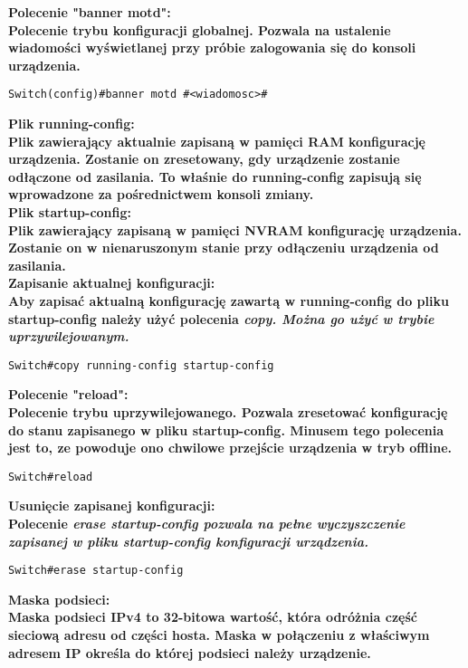 \documentclass[a4paper,12pt]{article}
\newcommand{\h}[1]{\noindent \bf #1 \rm \\ \noindent}
\begin{document}
\h{Polecenie "banner motd":}
Polecenie trybu konfiguracji globalnej. Pozwala na ustalenie wiadomości wyświetlanej przy próbie zalogowania się do konsoli urządzenia.
\begin{lstlisting}
Switch(config)#banner motd #<wiadomosc>#
\end{lstlisting}
\vspace{5mm}

\h{Plik running-config:}
Plik zawierający aktualnie zapisaną w pamięci RAM konfigurację urządzenia. Zostanie on zresetowany, gdy urządzenie zostanie odłączone od zasilania. To właśnie do running-config zapisują się wprowadzone za pośrednictwem konsoli zmiany.\\

\h{Plik startup-config:}
Plik zawierający zapisaną w pamięci NVRAM konfigurację urządzenia. Zostanie on w nienaruszonym stanie przy odłączeniu urządzenia od zasilania.\\

\newpage
\h{Zapisanie aktualnej konfiguracji:}
Aby zapisać aktualną konfigurację zawartą w running-config do pliku startup-config należy użyć polecenia \it copy\rm. Można go użyć w trybie uprzywilejowanym.
\begin{lstlisting}
Switch#copy running-config startup-config
\end{lstlisting}
\vspace{5mm}

\h{Polecenie "reload":}
Polecenie trybu uprzywilejowanego. Pozwala zresetować konfigurację do stanu zapisanego w pliku startup-config. Minusem tego polecenia jest to, ze powoduje ono chwilowe przejście urządzenia w tryb offline.
\begin{lstlisting}
Switch#reload
\end{lstlisting}
\vspace{5mm}

\h{Usunięcie zapisanej konfiguracji:}
Polecenie \it erase startup-config \rm pozwala na pełne wyczyszczenie zapisanej w pliku startup-config konfiguracji urządzenia.
\begin{lstlisting}
Switch#erase startup-config
\end{lstlisting}
\vspace{5mm}

\h{Maska podsieci:}
Maska podsieci IPv4 to 32-bitowa wartość, która odróżnia część sieciową adresu od części hosta. Maska w połączeniu z właściwym adresem IP określa do której podsieci należy urządzenie.\\
\end{document}
